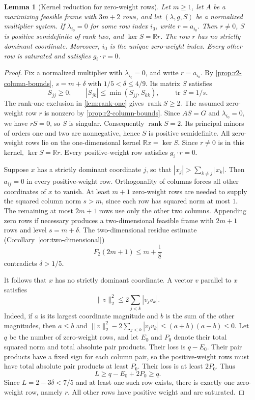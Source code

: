\documentclass[11pt]{article}
\numberwithin{equation}{section}
\newtheorem{lemma}[lemma]{Lemma}
\theoremstyle{definition}
\theoremstyle{definition}
\newcommand{\R}{\mathbb R}
\begin{document}
\begin{lemma}[Kernel reduction for zero-weight rows]
\label{lem:r2-kernel-reduction}
Let $m\ge1$, let $A$ be a maximizing feasible frame with $3m+2$
rows, and let $(\lambda,g,S)$ be a normalized multiplier system. If
$\lambda_{i_0}=0$ for some row index $i_0$, write $r=a_{i_0}$.
Then $r\ne0$, $S$ is positive semidefinite of rank two, and
$\ker S=\R r$. The row $r$ has no strictly dominant coordinate.
Moreover, $i_0$ is the unique zero-weight index. Every other row
is saturated and satisfies $g_i\cdot r=0$.
\end{lemma}
\begin{proof}
Fix a normalized multiplier with $\lambda_{i_0}=0$, and write
$r=a_{i_0}$. By \cref{prop:r2-column-bounds},
$s=m+\delta$ with $1/5<\delta\le4/9$. Its matrix $S$ satisfies
\[
 S_{jj}\ge0,\qquad |S_{jk}|\le\min(S_{jj},S_{kk}),
 \qquad \operatorname{tr}S=1/s.
\]
The rank-one exclusion in \cref{lem:rank-one} gives
$\operatorname{rank}S\ge2$. The assumed zero-weight row $r$
is nonzero by \cref{prop:r2-column-bounds}. Since $AS=G$ and
$\lambda_{i_0}=0$, we have $rS=0$, so $S$ is singular.
Consequently $\operatorname{rank}S=2$.  Its principal minors of
orders one and two are nonnegative, hence $S$ is positive
semidefinite.  All zero-weight rows lie on the one-dimensional kernel
$\R x=\ker S$. Since $r\ne0$ is in this kernel,
$\ker S=\R r$. Every positive-weight row satisfies
$g_i\cdot r=0$.

Suppose $x$ has a strictly dominant coordinate $j$, so that
$|x_j|>\sum_{k\ne j}|x_k|$.
Then $a_{ij}=0$ in every
positive-weight row. Orthogonality of columns forces all other
coordinates of $x$ to vanish. At least $m+1$ zero-weight rows are needed to supply the
squared column norm $s>m$, since each row has squared norm at most
$1$.  The remaining at most $2m+1$ rows use only the other two
columns.  Appending zero rows if necessary produces a two-dimensional
feasible frame with $2m+1$ rows and level $s=m+\delta$.
The two-dimensional residue estimate (Corollary~\ref{cor:two-dimensional})
\[
 F_2(2m+1)\le m+\frac18
\]
contradicts $\delta>1/5$.

It follows that $x$ has no strictly dominant coordinate.
A vector $v$ parallel to $x$ satisfies
\[
 \|v\|_2^2\le2\sum_{j<k}|v_jv_k|.
\]
Indeed, if $a$ is its largest coordinate magnitude and $b$ is the
sum of the other magnitudes, then $a\le b$ and
$\|v\|_2^2-2\sum_{j<k}|v_jv_k|\le(a+b)(a-b)\le0$.
Let $q$ be the number of zero-weight rows, and let $E_0$ and
$P_0$ denote their total squared norm and total absolute pair
products. Their loss is $q-E_0$. Their pair products have a
fixed sign for each column pair, so the positive-weight rows
must have total absolute pair products at least $P_0$.
Their loss is at least $2P_0$. Thus
\[
 L\ge q-E_0+2P_0\ge q.
\]
Since $L=2-3\delta<7/5$ and at least one such row exists,
there is exactly one zero-weight row, namely $r$.
All other rows have positive weight and are saturated.
\end{proof}
\end{document}
